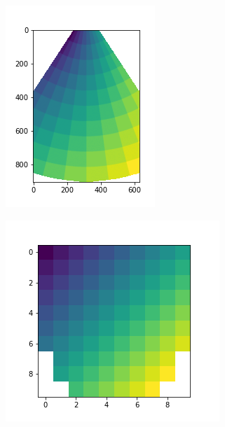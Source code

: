\documentclass[12pt]{article} %
\begin{document}
	\begin{figure}
	\centering
		\begin{subfigure}{0.29\textwidth}
		\includegraphics[width=\textwidth]{figuras/polar_original.png}
		\caption{}
		\end{subfigure}
		\begin{subfigure}{0.35\textwidth}
		\includegraphics[width=\textwidth]{figuras/polar_new.png}

\end{subfigure}
\end{figure}
\end{document}
